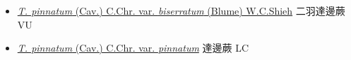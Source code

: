 \begin{itemize}
  \begin{itemize}
        \item[] \href{http://www.theplantlist.org/tpl1.1/search?q=Tapeinidium+pinnatum+var.+biserratum}{\textit{T. pinnatum} (Cav.) C.Chr. var. \textit{biserratum} (Blume) W.C.Shieh}   二羽達邊蕨 VU
        \item[] \href{http://www.theplantlist.org/tpl1.1/search?q=Tapeinidium+pinnatum+var.+pinnatum}{\textit{T. pinnatum} (Cav.) C.Chr. var. \textit{pinnatum}}   達邊蕨 LC
  \end{itemize}
  \end{itemize}
